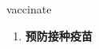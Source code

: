 
\begin{frame}
{\huge vaccinate}
\begin{center}
\begin{enumerate}\Large
  \item \textbf{预防接种疫苗}
\end{enumerate}
\end{center}
\end{frame}
